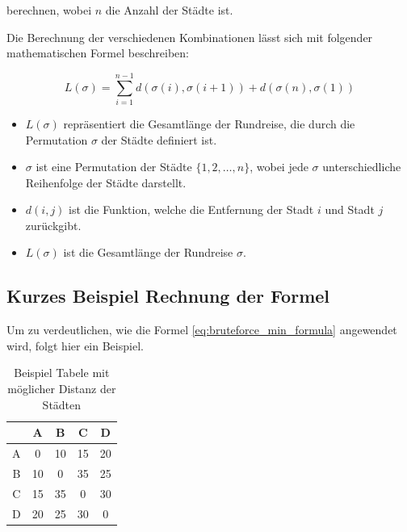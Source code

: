 berechnen, wobei \(n\) die Anzahl der Städte ist.

Die Berechnung der verschiedenen Kombinationen lässt sich mit folgender 
mathematischen Formel beschreiben:

\begin{equation}
    \label{eq:bruteforce_min_formula}
    L(\sigma) = \sum_{i=1}^{n-1} d(\sigma(i), \sigma(i+1)) + d(\sigma(n), \sigma(1))
\end{equation}

\begin{itemize}
    \item \( L(\sigma) \) repräsentiert die Gesamtlänge der Rundreise, die durch
          die Permutation \( \sigma \) der Städte definiert ist.
    \item \( \sigma \) ist eine Permutation der Städte \( \{1, 2, \ldots, n\} \),
          wobei jede \( \sigma \) unterschiedliche Reihenfolge der Städte darstellt.
    \item \( d(i, j) \) ist die Funktion, welche die Entfernung der Stadt \( i \) und
          Stadt \( j \) zurückgibt.
    \item \( L(\sigma) \) ist die Gesamtlänge der Rundreise \( \sigma \).
\end{itemize}

\subsection{Kurzes Beispiel Rechnung der Formel
\label{buch:paper:varalg:subsection:bruteforce_calculate}}
Um zu verdeutlichen, wie die Formel \ref{eq:bruteforce_min_formula}
angewendet wird, folgt hier ein Beispiel.

\begin{table}[h]
    \centering
    \begin{tabular}{|c|c|c|c|c|}
        \hline
          & A  & B  & C  & D  \\ \hline
        A & 0  & 10 & 15 & 20 \\ \hline
        B & 10 & 0  & 35 & 25 \\ \hline
        C & 15 & 35 & 0  & 30 \\ \hline
        D & 20 & 25 & 30 & 0  \\ \hline
    \end{tabular}
    \caption{Beispiel Tabele mit möglicher Distanz der Städten}
    \label{tab:example_bruteforce_cities}
\end{table}


